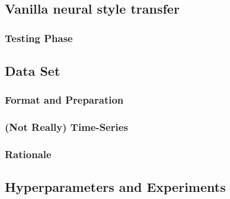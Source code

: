 \documentclass[runningheads]{llncs}
\begin{document}
\subsection{Vanilla neural style transfer}


\subsubsection{Testing Phase}

\subsection{Data Set}

\subsubsection {Format and Preparation}

\subsubsection {(Not Really) Time-Series}

\subsubsection {Rationale}

\subsection{Hyperparameters and Experiments}
\end{document}
